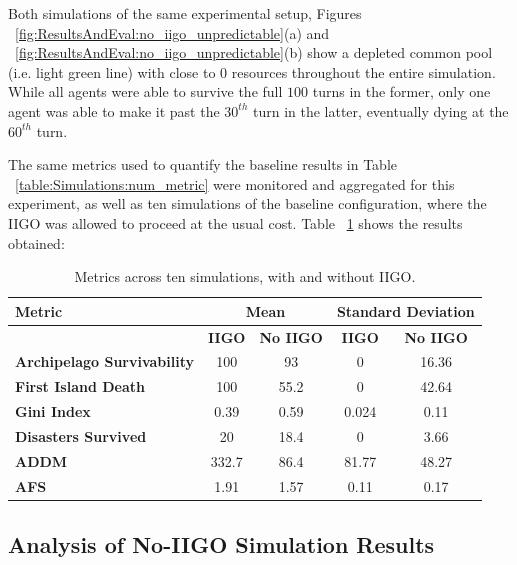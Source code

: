 Both simulations of the same experimental setup, Figures ~\ref{fig:ResultsAndEval:no_iigo_unpredictable}(a) and ~\ref{fig:ResultsAndEval:no_iigo_unpredictable}(b) show a depleted common pool (i.e. light green line) with close to 0 resources throughout the entire simulation. While all agents were able to survive the full $100$ turns in the former, only one agent was able to make it past the $30^{th}$ turn in the latter, eventually dying at the $60^{th}$ turn. 

The same metrics used to quantify the baseline results in Table ~\ref{table:Simulations:num_metric} were monitored and aggregated for this experiment, as well as ten simulations of the baseline configuration, where the IIGO was allowed to proceed at the usual cost. Table ~\ref{table:ResultsAndEval:iigo_vs_no_iigo} shows the results obtained:

\begin{table}[h]
    \centering
    \begin{tabular}{|l|c|c|c|c|}
    \hline
    \textbf{Metric}                     & \multicolumn{2}{c}{\textbf{Mean}}    & \multicolumn{2}{c}{\textbf{Standard Deviation}}   \\ \hline
                                        & \textbf{IIGO}      & \textbf{No IIGO}      &\textbf{IIGO}       & \textbf{No IIGO}                 \\ 
    \textbf{Archipelago Survivability}  & 100 & 93 & 0 & 16.36     \\
    \textbf{First Island Death}         & 100 & 55.2 & 0 & 42.64    \\
    \textbf{Gini Index}                 & 0.39 & 0.59 & 0.024 & 0.11   \\
    \textbf{Disasters Survived}         & 20 & 18.4 & 0 & 3.66    \\
    \textbf{ADDM}                       & 332.7 & 86.4 & 81.77 & 48.27    \\
    \textbf{AFS}                        & 1.91 & 1.57 & 0.11 & 0.17    \\ \hline
\end{tabular}
\caption{Metrics across ten simulations, with and without IIGO.}
\label{table:ResultsAndEval:iigo_vs_no_iigo}
\end{table}


\subsection{Analysis of No-IIGO Simulation Results}
\label{subsec:ResultsAndEval:no-iigo:analysis_non_iigo_results}


